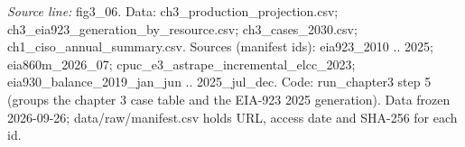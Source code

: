 {\scriptsize\textit{Source line:} fig3\_\allowbreak{}06. Data: ch3\_\allowbreak{}production\_\allowbreak{}projection.csv; ch3\_\allowbreak{}eia923\_\allowbreak{}generation\_\allowbreak{}by\_\allowbreak{}resource.csv; ch3\_\allowbreak{}cases\_\allowbreak{}2030.csv; ch1\_\allowbreak{}ciso\_\allowbreak{}annual\_\allowbreak{}summary.csv. Sources (manifest ids): eia923\_\allowbreak{}2010 .. 2025; eia860m\_\allowbreak{}2026\_\allowbreak{}07; cpuc\_\allowbreak{}e3\_\allowbreak{}astrape\_\allowbreak{}incremental\_\allowbreak{}elcc\_\allowbreak{}2023; eia930\_\allowbreak{}balance\_\allowbreak{}2019\_\allowbreak{}jan\_\allowbreak{}jun .. 2025\_\allowbreak{}jul\_\allowbreak{}dec. Code: run\_\allowbreak{}chapter3 step 5 (groups the chapter 3 case table and the EIA-923 2025 generation). Data frozen 2026-09-26; data/raw/manifest.csv holds URL, access date and SHA-256 for each id.}